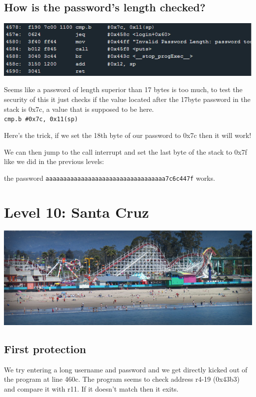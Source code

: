 \documentclass[a4paper,11pt]{article}
\begin{document}
\subsection{How is the password's length
checked?}\label{how-is-the-passwords-length-checked}

\includegraphics{img/9_1.PNG}

Seems like a password of length superior than 17 bytes is too much, to
test the security of this it just checks if the value located after the
17byte password in the stack is 0x7c, a value that is supposed to be
here.\\\texttt{cmp.b   \#0x7c, 0x11(sp)}

Here's the trick, if we set the 18th byte of our password to 0x7c then
it will work!

We can then jump to the call interrupt and set the last byte of the
stack to 0x7f like we did in the previous levels:

the password \texttt{aaaaaaaaaaaaaaaaaaaaaaaaaaaaaaaaaa7c6c447f} works.

\section{Level 10: Santa Cruz}\label{level-10-santa-cruz}

\includegraphics{img/10_5.PNG}

\subsection{First protection}\label{first-protection}

We try entering a long username and password and we get directly kicked
out of the program at line 460c. The program seems to check address
r4-19 (0x43b3) and compare it with r11. If it doesn't match then it
exits.
\end{document}
